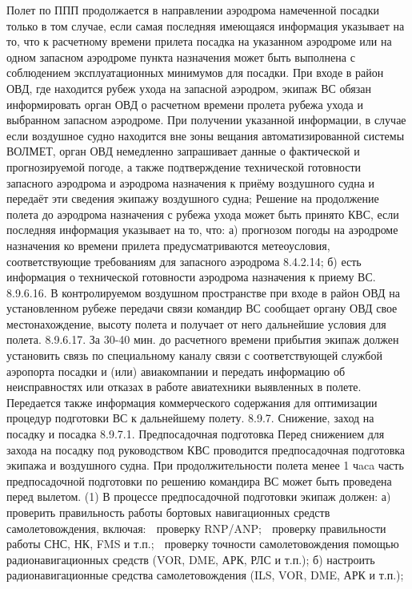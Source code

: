 Полет по ППП продолжается в направлении аэродрома намеченной посадки только в том случае, если самая последняя имеющаяся информация указывает на то, что к расчетному времени прилета посадка на указанном аэродроме или на одном запасном аэродроме пункта назначения может быть выполнена с соблюдением эксплуатационных минимумов для посадки.
При входе в район ОВД, где находится рубеж ухода на запасной аэродром, экипаж ВС обязан информировать орган ОВД о расчетном времени пролета рубежа ухода и выбранном запасном аэродроме. При получении указанной информации, в случае если воздушное судно находится вне зоны вещания автоматизированной системы ВОЛМЕТ, орган ОВД немедленно запрашивает данные о фактической и прогнозируемой погоде, а также подтверждение технической готовности запасного аэродрома и аэродрома назначения к приёму воздушного судна и передаёт эти сведения экипажу воздушного судна;
Решение на продолжение полета до аэродрома назначения с рубежа ухода может быть принято КВС, если последняя информация указывает на то, что: 
а)	прогнозом погоды на аэродроме назначения ко времени прилета предусматриваются метеоусловия, соответствующие требованиям для запасного аэродрома 8.4.2.14; 
б)	есть информация о технической готовности аэродрома назначения к приему ВС.
8.9.6.16. В контролируемом воздушном пространстве при входе в район ОВД на установленном рубеже передачи связи командир ВС сообщает органу ОВД свое местонахождение, высоту полета и получает от него дальнейшие условия для полета.
8.9.6.17. За 30-40 мин. до расчетного времени прибытия экипаж должен установить связь по специальному каналу связи с соответствующей службой аэропорта посадки и (или) авиакомпании и передать информацию об неисправностях или отказах в работе авиатехники выявленных в полете. Передается также информация коммерческого содержания для оптимизации процедур подготовки ВС к дальнейшему полету.
8.9.7.	Снижение, заход на посадку и посадка
8.9.7.1.	Предпосадочная подготовка
Перед снижением для захода на посадку под руководством КВС проводится предпосадочная подготовка экипажа и воздушного судна. При продолжительности полета менее 1 чaca часть предпосадочной подготовки по решению командира ВС может быть проведена перед вылетом.
(1) В процессе предпосадочной подготовки экипаж должен:
а)	проверить правильность работы бортовых навигационных средств самолетовождения, включая:
	проверку RNP/ANP;
	проверку правильности работы СНС, НК, FMS и т.п.;
	проверку точности самолетовождения помощью радионавигационных средств (VOR, DME, АРК, РЛС и т.п.);
б)	настроить радионавигационные средства самолетовождения (ILS, VOR, DME, АРК и т.п.);
